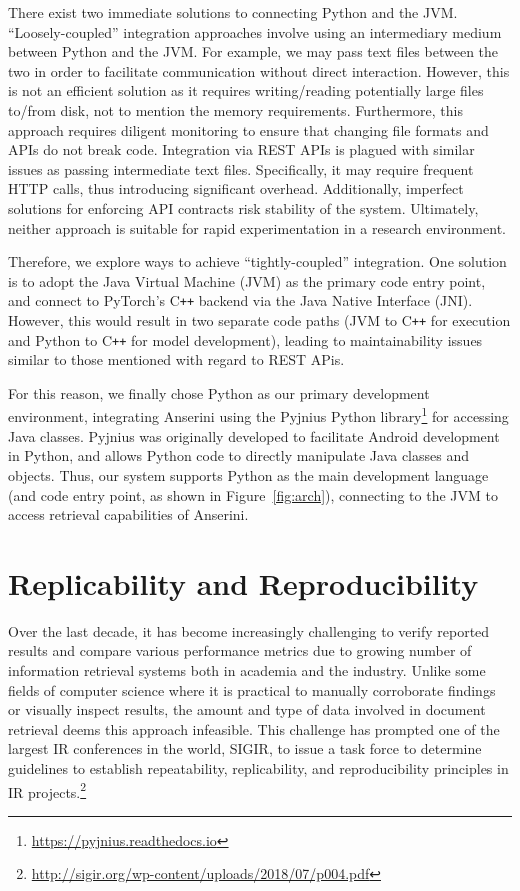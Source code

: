 There exist two immediate solutions to connecting Python and the JVM.
``Loosely-coupled'' integration approaches involve using an intermediary medium between Python and the JVM.
For example, we may pass text files between the two in order to facilitate communication without direct interaction.
However, this is not an efficient solution as it requires writing/reading potentially large files to/from disk, not to mention the memory requirements.
Furthermore, this approach requires diligent monitoring to ensure that changing file formats and APIs do not break code.
Integration via REST APIs is plagued with similar issues as passing intermediate text files.
Specifically, it may require frequent HTTP calls, thus introducing significant overhead.
Additionally, imperfect solutions for enforcing API contracts risk stability of the system.
Ultimately, neither approach is suitable for rapid experimentation in a research environment.

Therefore, we explore ways to achieve ``tightly-coupled'' integration.
One solution is to adopt the Java Virtual Machine (JVM) as the primary code entry point, and connect to PyTorch's C\texttt{++} backend via the Java Native Interface (JNI).
However, this would result in two separate code paths (JVM to C\texttt{++} for execution and Python to C\texttt{++} for model development), leading to maintainability issues similar to those mentioned with regard to REST APis.

For this reason, we finally chose Python as our primary development environment, integrating Anserini using the Pyjnius Python library\footnote{\url{https://pyjnius.readthedocs.io}} for accessing Java classes.
Pyjnius was originally developed to facilitate Android development in Python, and allows Python code to directly manipulate Java classes and objects.
Thus, our system supports Python as the main development language (and code entry point, as shown in Figure~\ref{fig:arch}), connecting to the JVM to access retrieval capabilities of Anserini.

\section{Replicability and Reproducibility}

Over the last decade, it has become increasingly challenging to verify reported results and compare various performance metrics due to growing number of information retrieval systems both in academia and the industry.
Unlike some fields of computer science where it is practical to manually corroborate findings or visually inspect results, the amount and type of data involved in document retrieval deems this approach infeasible.
This challenge has prompted one of the largest IR conferences in the world, SIGIR, to issue a task force to determine guidelines to establish repeatability, replicability, and reproducibility principles in IR projects.\footnote{\url{http://sigir.org/wp-content/uploads/2018/07/p004.pdf}}


